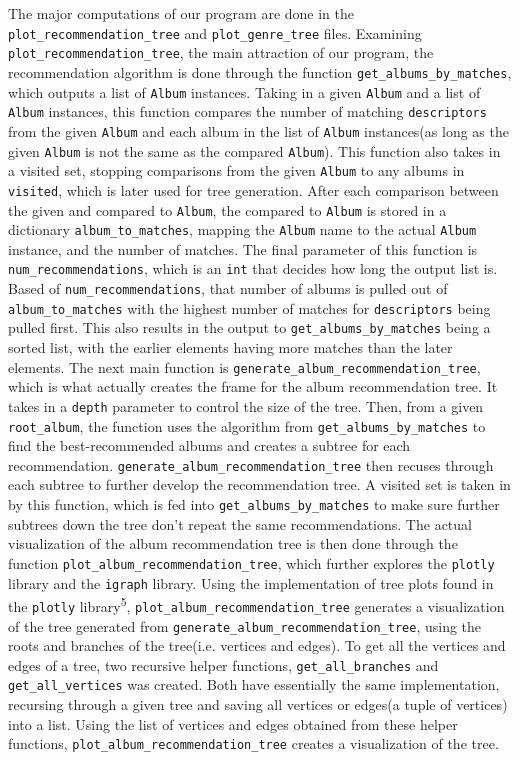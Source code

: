 \documentclass[fontsize=11pt]{article}
\begin{document}
The major computations of our program are done in the \texttt{plot\_recommendation\_tree} and \texttt{plot\_genre\_tree} files. Examining \texttt{plot\_recommendation\_tree}, the main attraction of our program, the recommendation algorithm is done through the function \texttt{get\_albums\_by\_matches}, which outputs a list of  \texttt{Album} instances. Taking in a given \texttt{Album} and a list of \texttt{Album} instances, this function compares the number of matching \texttt{descriptors} from the given \texttt{Album} and each album in the list of \texttt{Album} instances(as long as the given \texttt{Album} is not the same as the compared \texttt{Album}). This function also takes in a visited set, stopping comparisons from the given \texttt{Album} to any albums in \texttt{visited}, which is later used for tree generation. After each comparison between the given and compared to \texttt{Album}, the compared to \texttt{Album} is stored in a dictionary \texttt{album\_to\_matches}, mapping the \texttt{Album} name to the actual \texttt{Album} instance, and the number of matches. The final parameter of this function is \texttt{num\_recommendations}, which is an \texttt{int} that decides how long the output list is. Based of \texttt{num\_recommendations}, that number of albums is pulled out of \texttt{album\_to\_matches} with the highest number of matches for \texttt{descriptors} being pulled first. This also results in the output to \texttt{get\_albums\_by\_matches} being a sorted list, with the earlier elements having more matches than the later elements. The next main function is \texttt{generate\_album\_recommendation\_tree}, which is what actually creates the frame for the album recommendation tree. It takes in a \texttt{depth} parameter to control the size of the tree. Then, from a given \texttt{root\_album}, the function uses the algorithm from \texttt{get\_albums\_by\_matches} to find the best-recommended albums and creates a subtree for each recommendation. \texttt{generate\_album\_recommendation\_tree} then recuses through each subtree to further develop the recommendation tree. A visited set is taken in by this function, which is fed into \texttt{get\_albums\_by\_matches} to make sure further subtrees down the tree don't repeat the same recommendations. The actual visualization of the album recommendation tree is then done through the function \texttt{plot\_album\_recommendation\_tree}, which further explores the \texttt{plotly} library and the \texttt{igraph} library. Using the implementation  of tree plots found in the \texttt{plotly} library\textsuperscript{5}, \texttt{plot\_album\_recommendation\_tree} generates a visualization of the tree generated from \texttt{generate\_album\_recommendation\_tree}, using the roots and branches of the tree(i.e. vertices and edges). To get all the vertices and edges of a tree, two recursive helper functions, \texttt{get\_all\_branches} and \texttt{get\_all\_vertices} was created. Both have essentially the same implementation, recursing through a given tree and saving all vertices or edges(a tuple of vertices) into a list. Using the list of vertices and edges obtained from these helper functions, \texttt{plot\_album\_recommendation\_tree} creates a visualization of the tree. \newline
\end{document}
